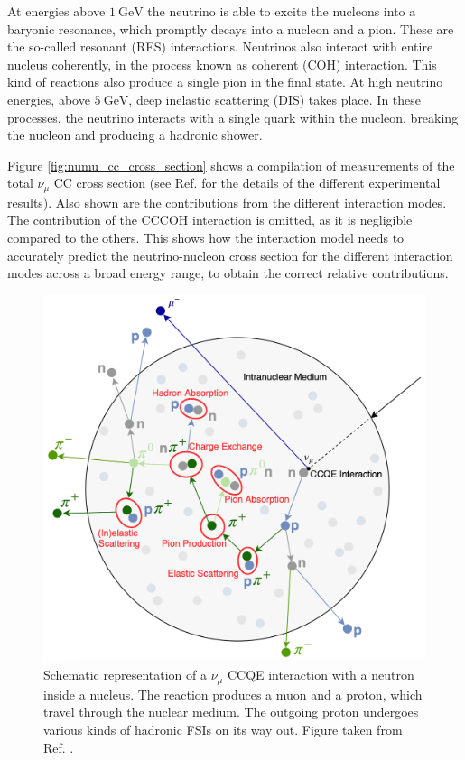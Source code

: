 At energies above $1~\mathrm{GeV}$ the neutrino is able to excite the nucleons into a baryonic resonance, which promptly decays into a nucleon and a pion. These are the so-called resonant (RES) interactions. Neutrinos also interact with entire nucleus coherently, in the process known as coherent (COH) interaction. This kind of reactions also produce a single pion in the final state. At high neutrino energies, above $5~\mathrm{GeV}$, deep inelastic scattering (DIS) takes place. In these processes, the neutrino interacts with a single quark within the nucleon, breaking the nucleon and producing a hadronic shower.

Figure \ref{fig:numu_cc_cross_section} shows a compilation of measurements of the total $\nu_{\mu}$ CC cross section (see Ref. \cite{Formaggio2012} for the details of the different experimental results). Also shown are the contributions from the different interaction modes. The contribution of the CCCOH interaction is omitted, as it is negligible compared to the others. This shows how the interaction model needs to accurately predict the neutrino-nucleon cross section for the different interaction modes across a broad energy range, to obtain the correct relative contributions.

\begin{figure}[t]
	\centering
	\includegraphics[width=.55\linewidth]{Images/Nu/lars_fsi.png}
	\caption[Schematic representation of a $\nu_{\mu}$ CCQE interaction with a neutron inside a nucleus.]{Schematic representation of a $\nu_{\mu}$ CCQE interaction with a neutron inside a nucleus. The reaction produces a muon and a proton, which travel through the nuclear medium. The outgoing proton undergoes various kinds of hadronic FSIs on its way out. Figure taken from Ref. \cite{Bathe-Peters2022}.}
	\label{fig:fsi_diagram}
\end{figure}

